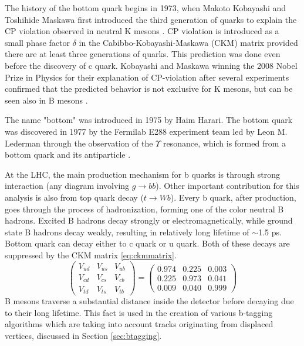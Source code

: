 The history of the bottom quark begins in 1973, when Makoto Kobayashi and Toshihide Maskawa first introduced the third generation of quarks to explain the CP violation observed in neutral K mesons \cite{Kobayashi:1973fv}. CP violation is introduced as a small phase factor $\delta$ in the Cabibbo-Kobayashi-Maskawa (CKM) matrix provided there are at least three generations of quarks. This prediction was done even before the discovery of c quark. Kobayashi and Maskawa winning the 2008 Nobel Prize in Physics for their explanation of CP-violation after several experiments confirmed that the predicted behavior is not exclusive for K mesons, but can be seen also in B mesons \cite{Aubert:2001sp,Abe:2001xe}.
\par The name "bottom" was introduced in 1975 by Haim Harari. The bottom quark was discovered in 1977 by the Fermilab E288 experiment team led by Leon M. Lederman through the observation of the $\Upsilon$ resonance, which is formed from a bottom quark and its antiparticle \cite{PhysRevLett.39.252}.  
\par At the LHC, the main production mechanism for b quarks is through strong interaction (any diagram involving $g\rightarrow bb$). Other important contribution for this analysis is also from top quark decay ($t\rightarrow Wb$). Every b quark, after production, goes through the process of hadronization, forming one of the color neutral B hadrons. Excited B hadrons decay strongly or electromagnetically, while ground state B hadrons decay weakly, resulting in relatively long lifetime of $\sim$1.5 ps. Bottom quark can decay either to c quark or u quark. Both of these decays are suppressed by the CKM matrix \ref{eq:ckmmatrix}.
\begin{equation} 
\begin{pmatrix}
V_{ud} & V_{us} & V_{ub} \\
V_{cd} & V_{cs} & V_{cb} \\
V_{td} & V_{ts} & V_{tb} 
\end{pmatrix} 
= \begin{pmatrix}
0.974 & 0.225 & 0.003 \\
0.225 & 0.973 & 0.041 \\
0.009 & 0.040 & 0.999 
\end{pmatrix} 
\label{eq:ckmmatrix} 
\end{equation}
B mesons traverse a substantial distance inside the detector before decaying due to their long lifetime. This fact is used in the creation of various b-tagging algorithms which are taking into account tracks originating from displaced vertices, discussed in Section \ref{sec:btagging}.




